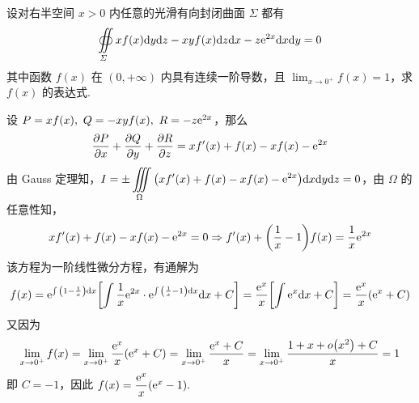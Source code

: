 \begin{example}
    设对右半空间 $x>0$ 内任意的光滑有向封闭曲面 $\varSigma$ 都有 $$\displaystyle\oiint\limits_\varSigma xf(x)\dd y\dd z-xyf(x)\dd z\dd x-z\mathrm{e}^{2x}\dd x\dd y=0$$
    其中函数 $f(x)$ 在 $(0,+\infty)$ 内具有连续一阶导数，且 $\displaystyle\lim_{x\to0^+}f(x)=1$，求 $f(x)$ 的表达式.
\end{example}
\begin{solution}
    设 $P=xf(x),~Q=-xyf(x),~R=-z\mathrm{e}^{2x}$，那么 $$\pdv{P}{x}+\pdv{Q}{y}+\pdv{R}{z}=xf'(x)+f(x)-xf(x)-\mathrm{e}^{2x}$$
    由 Gauss 定理知，$\displaystyle I=\pm\iiint\limits_\Omega\qty(xf'(x)+f(x)-xf(x)-\mathrm{e}^{2x})\dd x\dd y\dd z=0$，由 $\Omega$ 的任意性知，$$xf'(x)+f(x)-xf(x)-\mathrm{e}^{2x}=0\Rightarrow f'(x)+\qty(\dfrac{1}{x}-1)f(x)=\dfrac{1}{x}\mathrm{e}^{2x}$$
    该方程为一阶线性微分方程，有通解为 $$f(x)=\mathrm{e}^{\int\qty(1-\frac{1}{x})\dd x}\qty[\int\dfrac{1}{x}\mathrm{e}^{2x}\cdot\mathrm{e}^{\int\qty(\frac{1}{x}-1)\dd x}\dd x+C]=\dfrac{\mathrm{e}^{x}}{x}\qty[\int\mathrm{e}^{x}\dd x+C]=\dfrac{\mathrm{e}^{x}}{x}\qty(\mathrm{e}^{x}+C)$$
    又因为 $$\displaystyle\lim_{x\to0^+}f(x)=\lim_{x\to0^+}\dfrac{\mathrm{e}^x}{x}\qty(\mathrm{e}^x+C)=\lim_{x\to0^+}\dfrac{\mathrm{e}^x+C}{x}=\lim_{x\to0^+}\dfrac{1+x+o\qty(x^2)+C}{x}=1$$ 
    即 $C=-1$，因此 $f(x)=\dfrac{\mathrm{e}^x}{x}\qty(\mathrm{e}^x-1).$
\end{solution}

